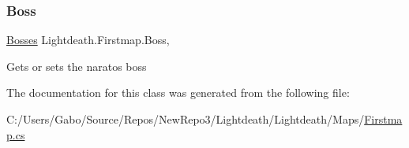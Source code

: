 \subsubsection{\texorpdfstring{Boss}{Boss}}
{\footnotesize\ttfamily \hyperlink{class_lightdeath_1_1_bosses}{Bosses} Lightdeath.\+Firstmap.\+Boss\hspace{0.3cm}{\ttfamily [get]}, {\ttfamily [set]}}



Gets or sets the naratos boss 



The documentation for this class was generated from the following file\+:\begin{DoxyCompactItemize}
\item 
C\+:/\+Users/\+Gabo/\+Source/\+Repos/\+New\+Repo3/\+Lightdeath/\+Lightdeath/\+Maps/\hyperlink{_firstmap_8cs}{Firstmap.\+cs}\end{DoxyCompactItemize}
